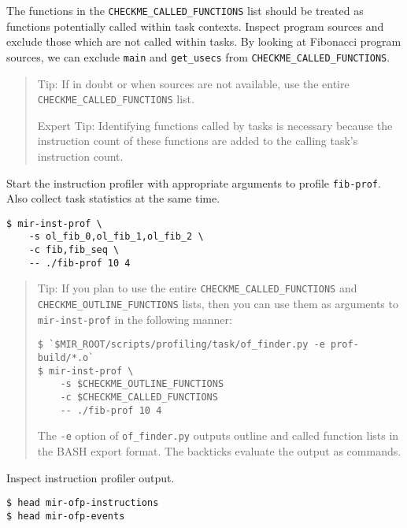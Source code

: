 \documentclass[11pt,a4paper]{article}
\begin{document}
The functions in the \texttt{CHECKME\_CALLED\_FUNCTIONS} list should be treated as functions potentially called within task contexts.  Inspect program sources and exclude those which are not called within tasks.  By looking at Fibonacci program sources, we can exclude \texttt{main} and \texttt{get\_usecs} from \texttt{CHECKME\_CALLED\_FUNCTIONS}. 
    
\begin{framed}
\begin{quote}
Tip: If in doubt or when sources are not available, use the entire \texttt{CHECKME\_CALLED\_FUNCTIONS} list. 

Expert Tip: Identifying functions called by tasks is necessary because the instruction count of these functions are added to the calling task's instruction count. 
\end{quote}
\end{framed}

Start the instruction profiler with appropriate arguments to profile \texttt{fib-prof}.  Also collect task statistics at the same time.

\begin{lstlisting}[style=MyInputStyle]
$ mir-inst-prof \
    -s ol_fib_0,ol_fib_1,ol_fib_2 \
    -c fib,fib_seq \
    -- ./fib-prof 10 4
\end{lstlisting}

\begin{framed}
\begin{quote}
    Tip: If you plan to use the entire \texttt{CHECKME\_CALLED\_FUNCTIONS} and \texttt{CHECKME\_OUTLINE\_FUNCTIONS} lists, then you can use them as arguments to \texttt{mir-inst-prof} in the following manner: 

\begin{lstlisting}[style=MyInputStyle]
$ `$MIR_ROOT/scripts/profiling/task/of_finder.py -e prof-build/*.o`
$ mir-inst-prof \
    -s $CHECKME_OUTLINE_FUNCTIONS
    -c $CHECKME_CALLED_FUNCTIONS
    -- ./fib-prof 10 4
\end{lstlisting}

The \texttt{-e} option of \texttt{of\_finder.py} outputs outline and called function lists in the BASH export format. The backticks evaluate the output as commands.
\end{quote}
\end{framed}

Inspect instruction profiler output. 

\begin{lstlisting}[style=MyInputStyle]
$ head mir-ofp-instructions
$ head mir-ofp-events
\end{lstlisting}
\end{document}
